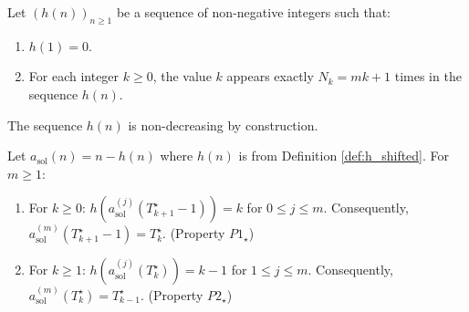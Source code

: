 \documentclass[10pt,a4paper]{amsart}
\begin{document}
\begin{definition} \label{def:h_shifted}
Let $(h(n))_{n \ge 1}$ be a sequence of non-negative integers such that:
\begin{enumerate}
    \item $h(1)=0$.
    \item For each integer $k \ge 0$, the value $k$ appears exactly $N_k = mk+1$ times in the sequence $h(n)$.
\end{enumerate}
The sequence $h(n)$ is non-decreasing by construction.
\end{definition}

\begin{lemma} \label{lem:P_shifted}
Let $a_{\text{sol}}(n) = n-h(n)$ where $h(n)$ is from Definition \ref{def:h_shifted}. For $m \ge 1$:
\begin{enumerate}
    \item For $k \ge 0$: $h(a_{\text{sol}}^{(j)}(T^{\star}_{k+1}-1)) = k$ for $0 \le j \le m$. Consequently, $a_{\text{sol}}^{(m)}(T^{\star}_{k+1}-1) = T^{\star}_k$. (Property $P1_{\star}$)
    \item For $k \ge 1$: $h(a_{\text{sol}}^{(j)}(T^{\star}_k)) = k-1$ for $1 \le j \le m$. Consequently, $a_{\text{sol}}^{(m)}(T^{\star}_k) = T^{\star}_{k-1}$. (Property $P2_{\star}$)
\end{enumerate}
\end{lemma}
\end{document}
